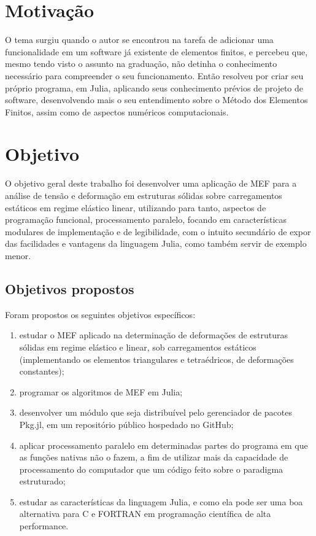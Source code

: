 \section{Motivação}

O tema surgiu quando o autor se encontrou na tarefa de adicionar uma funcionalidade em um software já existente de elementos finitos, e percebeu que, mesmo tendo visto o assunto na graduação, não detinha o conhecimento necessário para compreender o seu funcionamento. Então resolveu por criar seu próprio programa, em Julia, aplicando seus conhecimento prévios de projeto de software, desenvolvendo mais o seu entendimento sobre o Método dos Elementos Finitos, assim como de aspectos numéricos computacionais.


\section{Objetivo}

O objetivo geral deste trabalho foi desenvolver uma aplicação de MEF para a análise de tensão e deformação em estruturas sólidas sobre carregamentos estáticos em regime elástico linear, utilizando para tanto, aspectos de programação funcional, processamento paralelo, focando em características modulares de implementação e de legibilidade, com o intuito secundário de expor das facilidades e vantagens da linguagem Julia, como também servir de exemplo menor.

\subsection{Objetivos propostos}

Foram propostos os seguintes objetivos específicos:

\begin{enumerate}
    \item estudar o MEF aplicado na determinação de deformações de estruturas sólidas em regime elástico e linear, sob carregamentos estáticos (implementando os elementos triangulares e tetraédricos, de deformações constantes);
    \item programar os algoritmos de MEF em Julia;
    \item desenvolver um módulo que seja distribuível pelo gerenciador de pacotes Pkg.jl, em um repositório público hospedado no GitHub;
    \item aplicar processamento paralelo em determinadas partes do programa em que as funções nativas não o fazem, a fim de utilizar mais da capacidade de processamento do computador que um código feito sobre o paradigma estruturado;
    \item estudar as características da linguagem Julia, e como ela pode ser uma boa alternativa para C e FORTRAN em programação científica de alta performance.
\end{enumerate}

